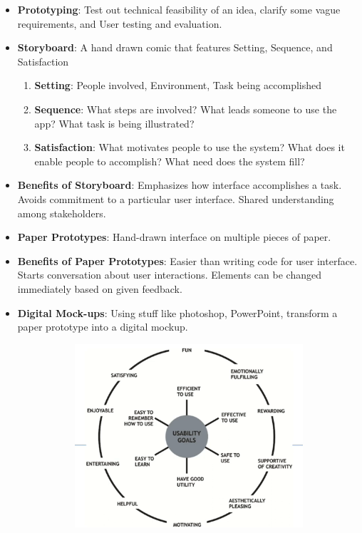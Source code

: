 \documentclass[a4paper]{article}
\begin{document}
\begin{itemize}
    \item \textbf{Prototyping}: Test out technical feasibility of an idea, clarify some vague requirements, and User testing and evaluation.
    \item \textbf{Storyboard}: A hand drawn comic that features Setting, Sequence, and Satisfaction
    \begin{enumerate}
        \item \textbf{Setting}: People involved, Environment, Task being accomplished
        \item \textbf{Sequence}: What steps are involved? What leads someone to use the app? What task is being illustrated?
        \item \textbf{Satisfaction}: What motivates people to use the system? What does it enable people to accomplish? What need does the system fill?
    \end{enumerate}
    \item \textbf{Benefits of Storyboard}: Emphasizes how interface accomplishes a task. Avoids commitment to a particular user interface. Shared understanding among stakeholders.
    \item \textbf{Paper Prototypes}: Hand-drawn interface on multiple pieces of paper.
    \item \textbf{Benefits of Paper Prototypes}: Easier than writing code for user interface. Starts conversation about user interactions. Elements can be changed immediately based on given feedback.
    \item \textbf{Digital Mock-ups}: Using stuff like photoshop, PowerPoint, transform a paper prototype into a digital mockup.
    \begin{figure}[H]
        \centering
        \begin{subfigure}[b]{0.45\textwidth}
            \centering
            \includegraphics[width=\textwidth]{Degree//static/SE_User_Goals.png}

\end{subfigure}
\end{figure}
\end{itemize}
\end{document}
